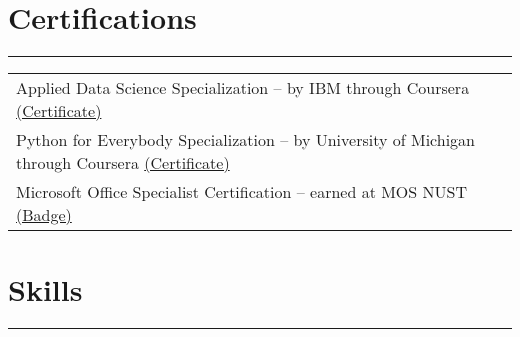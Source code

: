 \documentclass[a4paper, 11pt]{article}
\begin{document}
	
	\vspace{-4pt}
	\section*{Certifications}
	\vspace{-6pt}
	\hrule
	\vspace{12pt}
	\begin{tabular}{@{}>{\RaggedRight} p{17cm}}
	Applied Data Science Specialization -- by IBM through Coursera {\footnotesize{\href{https://coursera.org/share/b4356b0878bdabace9d5fb8f0e1d6de3}{(Certificate)}}}\\
	Python for Everybody Specialization -- by University of Michigan through Coursera {\footnotesize{\href{https://coursera.org/share/8a1bf24d4f31b014d65163016d413b37}{(Certificate)}}}\\
	Microsoft Office Specialist Certification -- earned at MOS NUST {\footnotesize{\href{https://www.youracclaim.com/users/notadilnaqvi/badges}{(Badge)}}}
	\end{tabular}
	
	\vspace{-4pt}
	\section*{Skills}
	\vspace{-6pt}
	\hrule
	\vspace{12pt}
\end{document}
